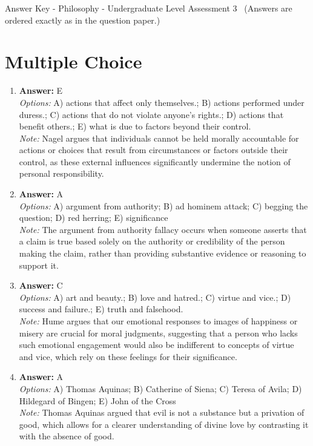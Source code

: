 \documentclass[12pt]{article}
\begin{document}
\begin{center}
Answer Key - Philosophy - Undergraduate Level Assessment 3 \
\small (Answers are ordered exactly as in the question paper.)
\end{center}

\section*{Multiple Choice}
\begin{enumerate}[label=\arabic*.]
\item \textbf{Answer:} E
\\ \textit{Options:} A) actions that affect only themselves.; B) actions performed under duress.; C) actions that do not violate anyone's rights.; D) actions that benefit others.; E) what is due to factors beyond their control.
\\ \textit{Note:} Nagel argues that individuals cannot be held morally accountable for actions or choices that result from circumstances or factors outside their control, as these external influences significantly undermine the notion of personal responsibility.
\item \textbf{Answer:} A
\\ \textit{Options:} A) argument from authority; B) ad hominem attack; C) begging the question; D) red herring; E) significance
\\ \textit{Note:} The argument from authority fallacy occurs when someone asserts that a claim is true based solely on the authority or credibility of the person making the claim, rather than providing substantive evidence or reasoning to support it.
\item \textbf{Answer:} C
\\ \textit{Options:} A) art and beauty.; B) love and hatred.; C) virtue and vice.; D) success and failure.; E) truth and falsehood.
\\ \textit{Note:} Hume argues that our emotional responses to images of happiness or misery are crucial for moral judgments, suggesting that a person who lacks such emotional engagement would also be indifferent to concepts of virtue and vice, which rely on these feelings for their significance.
\item \textbf{Answer:} A
\\ \textit{Options:} A) Thomas Aquinas; B) Catherine of Siena; C) Teresa of Avila; D) Hildegard of Bingen; E) John of the Cross
\\ \textit{Note:} Thomas Aquinas argued that evil is not a substance but a privation of good, which allows for a clearer understanding of divine love by contrasting it with the absence of good.

\end{enumerate}
\end{document}
